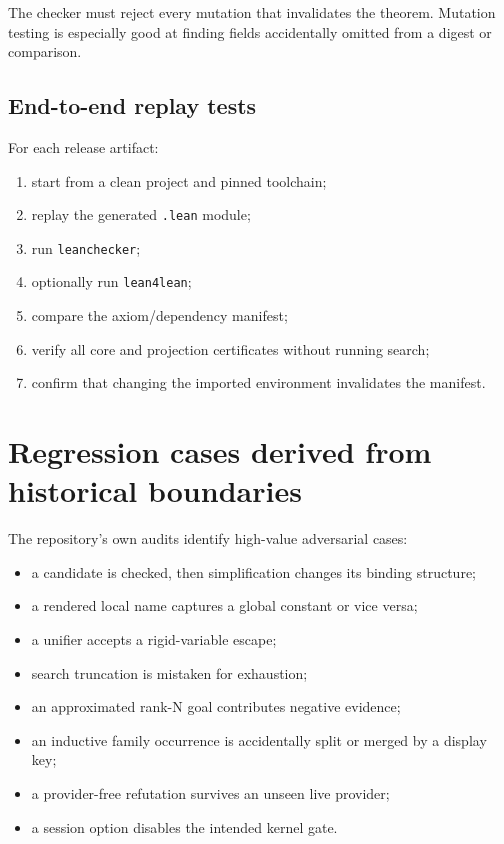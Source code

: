 \documentclass[11pt,letterpaper,openany]{report}
\theoremstyle{definition}
\theoremstyle{remark}
\newcommand{\code}[1]{\texttt{#1}}
\begin{document}
The checker must reject every mutation that invalidates the theorem. Mutation testing is especially good at finding fields accidentally omitted from a digest or comparison.

\subsection{End-to-end replay tests}

For each release artifact:

\begin{enumerate}
\item start from a clean project and pinned toolchain;
\item replay the generated \code{.lean} module;
\item run \code{leanchecker};
\item optionally run \code{lean4lean};
\item compare the axiom/dependency manifest;
\item verify all core and projection certificates without running search;
\item confirm that changing the imported environment invalidates the manifest.
\end{enumerate}

\section{Regression cases derived from historical boundaries}

The repository's own audits identify high-value adversarial cases:

\begin{itemize}
\item a candidate is checked, then simplification changes its binding structure;
\item a rendered local name captures a global constant or vice versa;
\item a unifier accepts a rigid-variable escape;
\item search truncation is mistaken for exhaustion;
\item an approximated rank-N goal contributes negative evidence;
\item an inductive family occurrence is accidentally split or merged by a display key;
\item a provider-free refutation survives an unseen live provider;
\item a session option disables the intended kernel gate.
\end{itemize}
\end{document}
